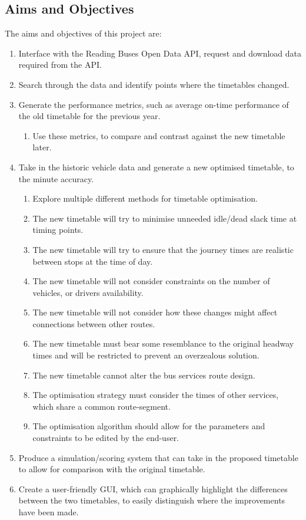 \documentclass{article}
\begin{document}
\subsection{Aims and Objectives}
The aims and objectives of this project are:
\label{aimsObjectivs}
\begin{enumerate}
	\item Interface with the Reading Buses Open Data API, request and download data required from the API.
	\item Search through the data and identify points where the timetables changed.
	\item Generate the performance metrics, such as average on-time performance of the old timetable for the previous year.
	\begin{enumerate}
		\item Use these metrics, to compare and contrast against the new timetable later. 
	\end{enumerate}
	\item Take in the historic vehicle data and generate a new optimised timetable, to the minute accuracy.
	\begin{enumerate}
		\item Explore multiple different methods for timetable optimisation.
		\item The new timetable will try to minimise unneeded idle/dead slack time at timing points.
		\item The new timetable will try to ensure that the journey times are realistic between stops at the time of day.
		\item The new timetable will not consider constraints on the number of vehicles, or drivers availability. 
		\item The new timetable will not consider how these changes might affect connections between other routes.
		\item The new timetable must bear some resemblance to the original headway times and will be restricted to prevent an overzealous solution.  
		\item The new timetable cannot alter the bus services route design.
		\item The optimisation strategy must consider the times of other services, which share a common route-segment.
		\item The optimisation algorithm should allow for the parameters and constraints to be edited by the end-user.
	\end{enumerate}
	\item Produce a simulation/scoring system that can take in the proposed timetable to allow for comparison with the original timetable.
	\item Create a user-friendly GUI, which can graphically highlight the differences between the two timetables, to easily distinguish where the improvements have been made.  
\end{enumerate}
\end{document}
